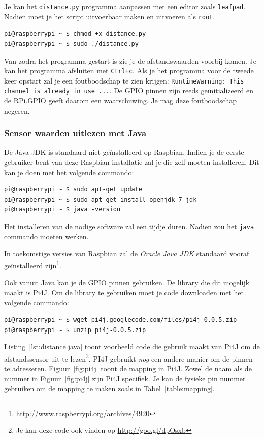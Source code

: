 \documentclass[a4paper]{article}
\begin{document}
  Je kan het \texttt{distance.py} programma aanpassen met een editor
zoals \texttt{leafpad}.  Nadien moet je het script uitvoerbaar maken
en uitvoeren als \texttt{root}.

\begin{lstlisting}
pi@raspberrypi ~ $ chmod +x distance.py
pi@raspberrypi ~ $ sudo ./distance.py
\end{lstlisting}

  Van zodra het programma gestart is zie je de afstandswaarden voorbij
komen.  Je kan het programma afsluiten met \texttt{Ctrl+c}.  Als je
het programma voor de tweede keer opstart zal je een foutboodschap te
zien krijgen: \texttt{RuntimeWarning: This channel is already in use
...}.  De GPIO pinnen zijn reeds ge\"initializeerd en de RPi.GPIO
geeft daarom een waarschuwing.  Je mag deze foutboodschap negeren.

    \subsubsection{Sensor waarden uitlezen met Java}

    De Java JDK is standaard niet ge\"installeerd op Raspbian.
Indien je de eerste gebruiker bent van deze Raspbian installatie zal je
die zelf moeten installeren.  Dit kan je doen met het volgende commando:
\begin{lstlisting}
pi@raspberrypi ~ $ sudo apt-get update
pi@raspberrypi ~ $ sudo apt-get install openjdk-7-jdk
pi@raspberrypi ~ $ java -version
\end{lstlisting}

    Het installeren van de nodige software zal een tijdje duren.
Nadien zou het \texttt{java} commando moeten werken.

    In toekomstige versies van Raspbian zal de \emph{Oracle Java JDK}
standaard vooraf ge\"installeerd
zijn\footnote{\url{http://www.raspberrypi.org/archives/4920}}.

    Ook vanuit Java kan je de GPIO pinnen gebruiken.  De library die
dit mogelijk maakt is Pi4J.  Om de library te gebruiken moet je code
downloaden met het volgende commando:
\begin{lstlisting}
pi@raspberrypi ~ $ wget pi4j.googlecode.com/files/pi4j-0.0.5.zip
pi@raspberrypi ~ $ unzip pi4j-0.0.5.zip
\end{lstlisting}

    Listing~\ref{lst:distance.java} toont voorbeeld code die gebruik
maakt van Pi4J om de afstandssensor uit te lezen\footnote{Je kan deze
code ook vinden op \url{http://goo.gl/dpOsxb}}.  PI4J gebruikt
\emph{nog} een andere manier om de pinnen te adresseren.
Figuur~\ref{fig:pi4j} toont de mapping in Pi4J.  Zowel de naam als de
nummer in Figuur~\ref{fig:pi4j} zijn Pi4J specifiek.  Je kan de
fysieke pin nummer gebruiken om de mapping te maken zoals in
Tabel~\ref{table:mapping}.
\end{document}
